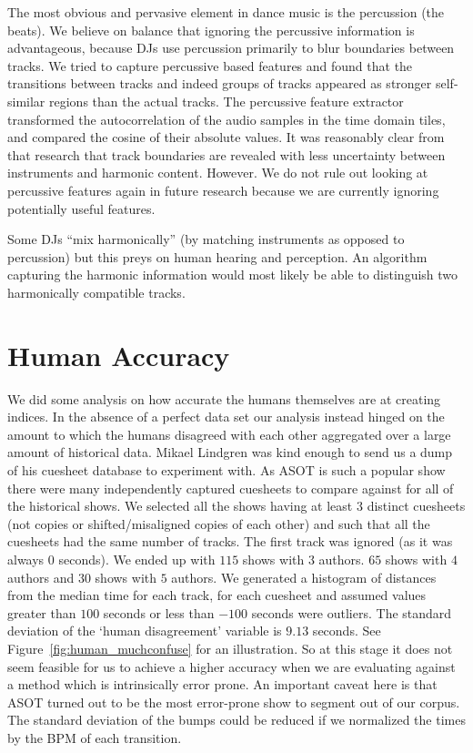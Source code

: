 \documentclass[twocolumn]{article}
\begin{document}
	The most obvious and pervasive element in dance music is the percussion (the beats). We believe on balance that ignoring the percussive information is advantageous, because DJs use percussion primarily to blur boundaries between tracks.  We tried to capture percussive based features and found that the transitions between tracks and indeed groups of tracks appeared as stronger self-similar regions than the actual tracks. The percussive feature extractor transformed the autocorrelation of the audio samples in the time domain tiles, and compared the cosine of their absolute values. It was reasonably clear from that  research that track boundaries are revealed with less uncertainty between instruments and harmonic content. However. We do not rule out looking at percussive features again in future research because we are currently ignoring potentially useful features.
	
	Some DJs ``mix harmonically'' (by matching instruments as opposed to percussion) but this preys on human hearing and perception. An algorithm capturing the harmonic information would most likely be able to distinguish two harmonically compatible tracks. 
	
	\section{Human Accuracy}\label{human_acc}
	
	We did some analysis on how accurate the humans themselves are at creating indices. In the absence of a perfect data set our analysis instead hinged on the amount to which the humans disagreed with each other aggregated over a large amount of historical data. Mikael Lindgren was kind enough to send us a dump of his cuesheet database to experiment with. As ASOT is such a popular show there were many independently captured cuesheets to compare against for all of the historical shows. We selected all the shows having at least $3$ distinct cuesheets (not copies or shifted/misaligned copies of each other)  and such that all the cuesheets had the same number of tracks. The first track was ignored (as it was always $0$ seconds). We ended up with $115$ shows with $3$ authors. $65$ shows with $4$ authors and $30$ shows with $5$ authors.  We generated a histogram of distances from the median time for each track, for each cuesheet and assumed values greater than $100$ seconds or less than $-100$ seconds were outliers. The standard deviation of the `human disagreement' variable is $9.13$ seconds. See Figure~\ref{fig:human_muchconfuse} for an illustration. So at this stage it does not seem feasible for us to achieve a higher accuracy when we are evaluating against a method which is intrinsically error prone. An important caveat here is that ASOT turned out to be the most error-prone show to segment out of our corpus. The standard deviation of the bumps could be reduced if we normalized the times by the BPM of each transition. 
	
\end{document}

